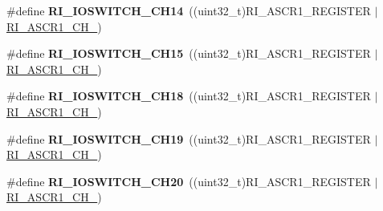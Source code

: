 \begin{DoxyCompactItemize}
\item 
\hypertarget{group___r_i___i_o_switch_ga4d620b8940da85a37de94440dd926531}{\#define {\bfseries R\-I\-\_\-\-I\-O\-S\-W\-I\-T\-C\-H\-\_\-\-C\-H14}~((uint32\-\_\-t)R\-I\-\_\-\-A\-S\-C\-R1\-\_\-\-R\-E\-G\-I\-S\-T\-E\-R $\vert$ \hyperlink{group___peripheral___registers___bits___definition_ga3dd4bd779d14f04ca4f9d72dd772d0e9}{R\-I\-\_\-\-A\-S\-C\-R1\-\_\-\-C\-H\-\_})}\label{group___r_i___i_o_switch_ga4d620b8940da85a37de94440dd926531}

\item 
\hypertarget{group___r_i___i_o_switch_gabbebf3228e1d303278cd34d6261d99bd}{\#define {\bfseries R\-I\-\_\-\-I\-O\-S\-W\-I\-T\-C\-H\-\_\-\-C\-H15}~((uint32\-\_\-t)R\-I\-\_\-\-A\-S\-C\-R1\-\_\-\-R\-E\-G\-I\-S\-T\-E\-R $\vert$ \hyperlink{group___peripheral___registers___bits___definition_ga7171966843026503e0319c89d95dc275}{R\-I\-\_\-\-A\-S\-C\-R1\-\_\-\-C\-H\-\_})}\label{group___r_i___i_o_switch_gabbebf3228e1d303278cd34d6261d99bd}

\item 
\hypertarget{group___r_i___i_o_switch_gabef05696c9554eb7ce80e9bfa795c439}{\#define {\bfseries R\-I\-\_\-\-I\-O\-S\-W\-I\-T\-C\-H\-\_\-\-C\-H18}~((uint32\-\_\-t)R\-I\-\_\-\-A\-S\-C\-R1\-\_\-\-R\-E\-G\-I\-S\-T\-E\-R $\vert$ \hyperlink{group___peripheral___registers___bits___definition_gaceb195ff1c181b4cfc9586ac7c19a34d}{R\-I\-\_\-\-A\-S\-C\-R1\-\_\-\-C\-H\-\_})}\label{group___r_i___i_o_switch_gabef05696c9554eb7ce80e9bfa795c439}

\item 
\hypertarget{group___r_i___i_o_switch_ga23e857f3b2c617e62a95231caaedf16f}{\#define {\bfseries R\-I\-\_\-\-I\-O\-S\-W\-I\-T\-C\-H\-\_\-\-C\-H19}~((uint32\-\_\-t)R\-I\-\_\-\-A\-S\-C\-R1\-\_\-\-R\-E\-G\-I\-S\-T\-E\-R $\vert$ \hyperlink{group___peripheral___registers___bits___definition_gab7ca7729b1644b9d9ace22e5815b596e}{R\-I\-\_\-\-A\-S\-C\-R1\-\_\-\-C\-H\-\_})}\label{group___r_i___i_o_switch_ga23e857f3b2c617e62a95231caaedf16f}

\item 
\hypertarget{group___r_i___i_o_switch_gaf87063b0800de54e61cba45e49af0508}{\#define {\bfseries R\-I\-\_\-\-I\-O\-S\-W\-I\-T\-C\-H\-\_\-\-C\-H20}~((uint32\-\_\-t)R\-I\-\_\-\-A\-S\-C\-R1\-\_\-\-R\-E\-G\-I\-S\-T\-E\-R $\vert$ \hyperlink{group___peripheral___registers___bits___definition_ga5a76688e594aebf9ead13d28a4618534}{R\-I\-\_\-\-A\-S\-C\-R1\-\_\-\-C\-H\-\_})}\label{group___r_i___i_o_switch_gaf87063b0800de54e61cba45e49af0508}


\end{DoxyCompactItemize}
